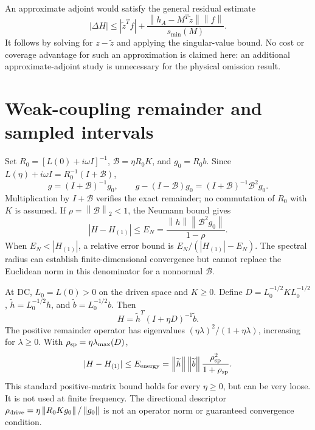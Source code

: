 \documentclass[11pt]{article}
\newcommand{\norm}[1]{\left\lVert#1\right\rVert}
\begin{document}
An approximate adjoint would satisfy the general residual estimate
\begin{equation}
|\Delta H|\leq|\widetilde z^Tf|+
\frac{\norm{h_A-M^T\widetilde z}\norm f}{s_{\min}(M)}.
\end{equation}
It follows by solving for $z-\widetilde z$ and applying the singular-value bound. No cost or coverage advantage for such an approximation is claimed here: an additional approximate-adjoint study is unnecessary for the physical omission result.

\section{Weak-coupling remainder and sampled intervals}
Set $R_0=[L(0)+i\omega I]^{-1}$, $\mathcal B=\eta R_0K$, and $g_0=R_0b$. Since $L(\eta)+i\omega I=R_0^{-1}(I+\mathcal B)$,
\begin{equation}
g=(I+\mathcal B)^{-1}g_0,\qquad
 g-(I-\mathcal B)g_0=(I+\mathcal B)^{-1}\mathcal B^2g_0.
\end{equation}
Multiplication by $I+\mathcal B$ verifies the exact remainder; no commutation of $R_0$ with $K$ is assumed. If $\rho=\norm{\mathcal B}_2<1$, the Neumann bound gives
\begin{equation}
|H-H_{(1)}|\leq E_N=\frac{\norm h\norm{\mathcal B^2g_0}}{1-\rho}.
\end{equation}
When $E_N<|H_{(1)}|$, a relative error bound is $E_N/(|H_{(1)}|-E_N)$. The spectral radius can establish finite-dimensional convergence but cannot replace the Euclidean norm in this denominator for a nonnormal $\mathcal B$.

At DC, $L_0=L(0)>0$ on the driven space and $K\geq0$. Define $D=L_0^{-1/2}KL_0^{-1/2}$, $\widetilde h=L_0^{-1/2}h$, and $\widetilde b=L_0^{-1/2}b$. Then
\begin{equation}
H=\widetilde h^T(I+\eta D)^{-1}\widetilde b.
\end{equation}
The positive remainder operator has eigenvalues $(\eta\lambda)^2/(1+\eta\lambda)$, increasing for $\lambda\geq0$. With $\rho_{\rm sp}=\eta\lambda_{\max}(D)$,
\begin{equation}
|H-H_{(1)}|\leq E_{\rm energy}=
\norm{\widetilde h}\norm{\widetilde b}\frac{\rho_{\rm sp}^2}{1+\rho_{\rm sp}}.
\end{equation}
This standard positive-matrix bound holds for every $\eta\geq0$, but can be very loose. It is not used at finite frequency. The directional descriptor $\rho_{\rm drive}=\eta\norm{R_0Kg_0}/\norm{g_0}$ is not an operator norm or guaranteed convergence condition.
\end{document}
